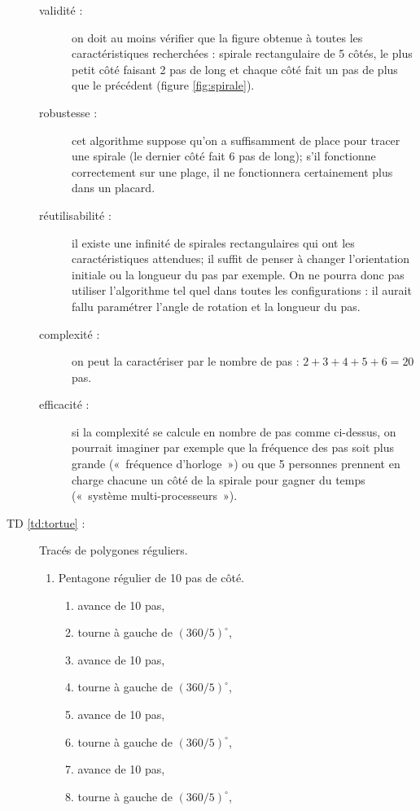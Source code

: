 \begin{description}
	\begin{description}
	\item[validité :] on doit au moins vérifier que la figure obtenue à toutes
		les caractéristiques recherchées : spirale rectangulaire de
		5 côtés, le plus petit côté faisant 2 pas de long et chaque 
		côté fait un pas de plus que le précédent (figure \ref{fig:spirale}).
	\item[robustesse :] cet algorithme suppose qu'on a suffisamment de place pour
		tracer une spirale (le dernier côté fait 6 pas de long); s'il fonctionne 
		correctement sur une plage, il ne fonctionnera certainement plus dans un
		placard.
	\item[réutilisabilité :] il existe une infinité de spirales rectangulaires
		qui ont les caractéristiques attendues; il suffit de penser
		à changer l'orientation initiale ou la longueur du pas par exemple. 
		On ne pourra donc pas utiliser l'algorithme tel quel dans toutes les
		configurations : il aurait fallu paramétrer l'angle de rotation et la
		longueur du pas.
	\item[complexité :] on peut la caractériser par le nombre de pas : 
		$2 + 3 + 4 + 5 + 6 = 20$ pas.
	\item[efficacité :] si la complexité se calcule en nombre de pas comme
		ci-dessus, on pourrait imaginer par exemple que la fréquence des
		pas soit plus grande («~fréquence d'horloge~») ou que 
		5 personnes prennent en charge chacune un côté de la spirale 
		pour gagner du temps («~système multi-processeurs~»).
	\end{description}
\newpage
\item[TD \ref{td:tortue} :] Tracés de polygones réguliers.
	\begin{enumerate}
	\item Pentagone régulier de 10 pas de côté.\\
		\begin{minipage}{6cm}
		\begin{enumerate}
		\item avance de 10 pas,
		\item tourne à gauche de $(360/5)^\circ$,
		\item avance de 10 pas,
		\item tourne à gauche de $(360/5)^\circ$,
		\item avance de 10 pas,
		\item tourne à gauche de $(360/5)^\circ$,
		\item avance de 10 pas,
		\item tourne à gauche de $(360/5)^\circ$,

\end{enumerate}
\end{minipage}
\end{enumerate}
\end{description}
